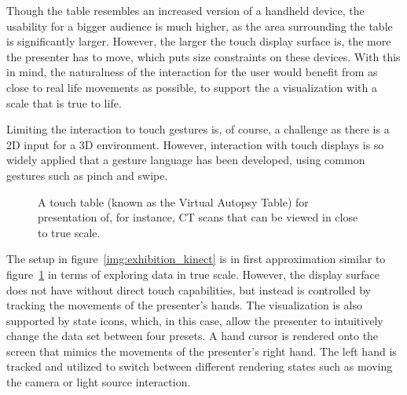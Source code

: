 \documentclass[review,journal]{vgtc}         %
\begin{document}
Though the table resembles an increased version of a handheld device, the usability for a bigger audience is much higher, as the area surrounding the table is significantly larger.
However, the larger the touch display surface is, the more the presenter has to move, which puts size constraints on these devices.
With this in mind, the naturalness of the interaction for the user would benefit from as close to real life movements as possible, to support the a visualization with a scale that is true to life.

Limiting the interaction to touch gestures is, of course, a challenge as there is a 2D input for a 3D environment.
However, interaction with touch displays is so widely applied that a gesture language has been developed, using common gestures such as pinch and swipe.

\begin{figure}[htb]
	\centering
	\caption{A touch table (known as the Virtual Autopsy Table) for presentation of, for instance, CT scans that can be viewed in close to true scale.}
	\label{img:exhibition_table}
\end{figure}

The setup in figure~\ref{img:exhibition_kinect} is in first approximation similar to figure~\ref{img:exhibition_table} in terms of exploring data in true scale.
However, the display surface does not have without direct touch capabilities, but instead is controlled by tracking the movements of the presenter's hands.
The visualization is also supported by state icons, which, in this case, allow the presenter to intuitively change the data set between four presets.
A hand cursor is rendered onto the screen that mimics the movements of the presenter's right hand.
The left hand is tracked and utilized to switch between different rendering states such as moving the camera or light source interaction.
\end{document}
